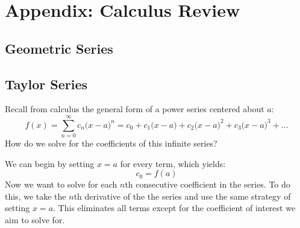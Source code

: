 \chapter{Appendix: Calculus Review}
\label{app:calc}
\section{Geometric Series}
\label{sec:geometric}

\section{Taylor Series}
\label{sec:taylor}
Recall from calculus the general form of a power series centered about $a$:
    \begin{equation}
        f(x) = \sum_{n=0}^{\infty} c_n {\big(x - a\big)}^n = c_0 + c_1{\big(x - a\big)}
            + c_2{\big(x - a\big)}^2 + c_3{\big(x - a\big)}^3 + ...
        \label{eq:power_series}
    \end{equation}
How do we solve for the coefficients of this infinite series?

\vspace{0.5cm}
\noindent
We can begin by setting $x = a$ for every term, which yields:
    \begin{equation}
        c_0 = f(a)
        \label{eq:power_first}
    \end{equation}
Now we want to solve for each $n$th consecutive coefficient in the series.  To do this, we take the $n$th derivative of the the series and use the same strategy of setting $x = a$.  This eliminates all terms except for the coefficient of interest we aim to solve for.

